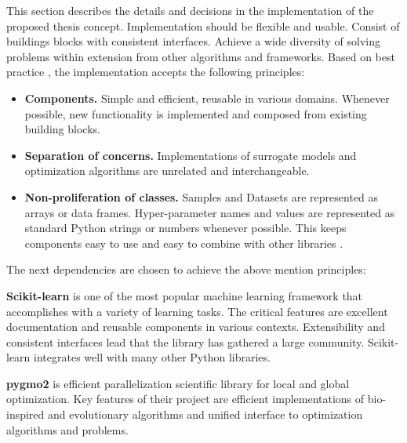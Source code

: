 This section describes the details and decisions in the implementation of the proposed thesis concept. Implementation should be flexible and usable. Consist of buildings blocks with consistent interfaces. Achieve a wide diversity of solving problems within extension from other algorithms and frameworks. Based on best practice \cite{buitinck2013api}, the implementation accepts the following principles:
\begin{itemize}
    \item \textbf{Components.} Simple and efficient, reusable in various domains. Whenever possible, new functionality is implemented and composed from existing building blocks.
    \item \textbf{Separation of concerns.} Implementations of surrogate models and optimization algorithms are unrelated and interchangeable. 
    \item \textbf{Non-proliferation of classes.} Samples and Datasets are represented as arrays or data frames. Hyper-parameter names and values are represented as standard Python strings or numbers whenever possible. This keeps components easy to use and easy to combine with other libraries \cite{buitinck2013api}.
\end{itemize}


The next dependencies are chosen to achieve the above mention principles:
\begin{description}
    \item \textbf{Scikit-learn} \cite{art-scikit-learn} is one of the most popular machine learning framework that accomplishes with a variety of learning tasks. The critical features are excellent documentation and reusable components in various contexts. Extensibility and consistent interfaces lead that the library has gathered a large community. Scikit-learn integrates well with many other Python libraries. 
    \item \textbf{pygmo2} \cite{francesco_biscani_2019} is efficient parallelization scientific library for local and global optimization. Key features of their project are efficient implementations of bio-inspired and evolutionary algorithms and unified interface to optimization algorithms and problems. 
\end{description}

               





